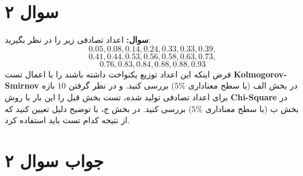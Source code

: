 \section*{سوال ۲}

\textbf{سوال:} اعداد تصادفی زیر را در نظر بگیرید:
$$
0.05, 0.08, 0.14, 0.24, 0.33, 0.33, 0.39,
$$
$$
0.41, 0.44, 0.53, 0.56, 0.58, 0.63, 0.73,
$$
$$
 0.76, 0.83, 0.84, 0.88, 0.88, 0.93
$$
فرض اینکه این اعداد توزیع یکنواخت داشته باشند را با اعمال تست \textbf{Kolmogorov-Smirnov} در بخش الف (با سطح معناداری \(5\%\)) بررسی کنید.
و در نظر گرفتن \(10\) بازه برای اعداد تصادفی تولید شده، تست بخش قبل را این بار با روش \textbf{Chi-Square} در بخش ب (با سطح معناداری \(5\%\)) بررسی کنید.
در بخش ج، با توضیح دلیل تعیین کنید که از نتیجه کدام تست باید استفاده کرد.

\section*{جواب سوال ۲}